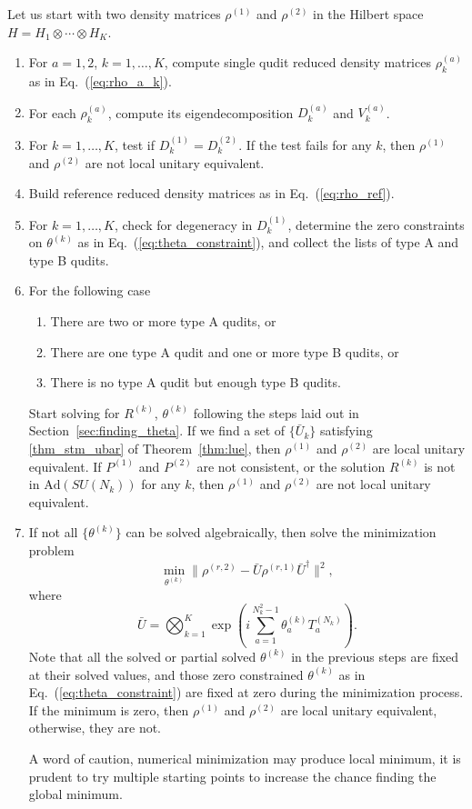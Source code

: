 \documentclass{article}
\begin{document}
Let us start with two density matrices $\rho^{(1)}$ and $\rho^{(2)}$
in the Hilbert space $H = H_1\otimes\cdots\otimes H_K$.
\begin{enumerate}
\item For $a = 1, 2$, $k = 1,\ldots,K$, compute single qudit
  reduced density matrices $\rho^{(a)}_k$ as in Eq.~(\ref{eq:rho_a_k}).
\item For each $\rho^{(a)}_k$, compute its eigendecomposition $D^{(a)}_k$
  and $V^{(a)}_k$.
\item For $k = 1,\ldots,K$, test if $D^{(1)}_k = D^{(2)}_k$.  If the test
  fails for any $k$, then $\rho^{(1)}$ and $\rho^{(2)}$ are not local
  unitary equivalent.
\item Build reference reduced density matrices as in
  Eq.~(\ref{eq:rho_ref}).
\item For $k = 1,\ldots,K$, check for degeneracy in $D^{(1)}_k$,
  determine the zero constraints on $\theta^{(k)}$ as in
  Eq.~(\ref{eq:theta_constraint}), and collect the lists of type A
  and type B qudits.
\item For the following case
  \begin{enumerate}
  \item There are two or more type A qudits, or
  \item There are one type A qudit and one or more type B qudits, or
  \item There is no type A qudit but enough type B qudits.
  \end{enumerate}
  Start solving for $R^{(k)}$, $\theta^{(k)}$ following the steps laid
  out in Section~\ref{sec:finding_theta}.  If we find a set of
  $\{\bar U_k\}$ satisfying \ref{thm_stm_ubar} of Theorem~\ref{thm:lue},
  then $\rho^{(1)}$ and $\rho^{(2)}$ are local unitary equivalent.
  If $P^{(1)}$ and $P^{(2)}$ are not consistent, or the solution
  $R^{(k)}$ is not in $\text{Ad}(SU(N_k))$ for any $k$, then
  $\rho^{(1)}$ and $\rho^{(2)}$ are not local unitary equivalent.
\item If not all $\{\theta^{(k)}\}$ can be solved algebraically, then
  solve the minimization problem
  \begin{equation}
    \min_{\theta^{(k)}}\lVert \rho^{(r,2)}-\bar U\rho^{(r,1)}\bar U^\dagger\rVert^2,
  \end{equation}
  where
  \begin{equation}
    \bar U = \bigotimes_{k=1}^K\exp\left(i\sum_{a=1}^{N_k^2-1}
    \theta^{(k)}_aT^{(N_k)}_a\right).
  \end{equation}
  Note that all the solved or partial solved $\theta^{(k)}$ in the
  previous steps are fixed at their solved values, and those zero
  constrained $\theta^{(k)}$ as in Eq.~(\ref{eq:theta_constraint})
  are fixed at zero during the minimization process.
  If the minimum is zero, then $\rho^{(1)}$ and $\rho^{(2)}$ are
  local unitary equivalent, otherwise, they are not.

  A word of caution, numerical minimization may produce local
  minimum, it is prudent to try multiple starting points to
  increase the chance finding the global minimum.
\end{enumerate}
\end{document}
